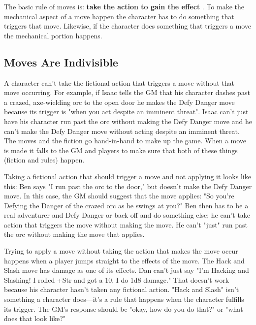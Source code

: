  

The basic rule of moves is: {\bf take the action to gain the effect} . To make the mechanical aspect of a move happen the character has to do something that triggers that move. Likewise, if the character does something that triggers a move the mechanical portion happens.

 
\subsection{Moves Are Indivisible}    
 

A character can't take the fictional action that triggers a move without that move occurring. For example, if Isaac tells the GM that his character dashes past a crazed, axe-wielding orc to the open door he makes the Defy Danger move because its trigger is "when you act despite an imminent threat". Isaac can't just have his character run past the orc without making the Defy Danger move and he can't make the Defy Danger move without acting despite an imminent threat. The moves and the fiction go hand-in-hand to make up the game. When a move is made it falls to the GM and players to make sure that both of these things (fiction and rules) happen.

 

Taking a fictional action that should trigger a move and not applying it looks like this: Ben says "I run past the orc to the door," but doesn't make the Defy Danger move. In this case, the GM should suggest that the move applies: "So you're Defying the Danger of the crazed orc as he swings at you?" Ben then has to be a real adventurer and Defy Danger or back off and do something else; he can't take action that triggers the move without making the move. He can't "just" run past the orc without making the move that applies.

 

Trying to apply a move without taking the action that makes the move occur happens when a player jumps straight to the effects of the move. The Hack and Slash move has damage as one of its effects. Dan can't just say "I'm Hacking and Slashing! I rolled +Str and got a 10, I do 1d8 damage." That doesn't work because his character hasn't taken any fictional action. "Hack and Slash" isn't something a character does—it's a rule that happens when the character fulfills its trigger. The GM's response should be "okay, how do you do that?" or "what does that look like?"

